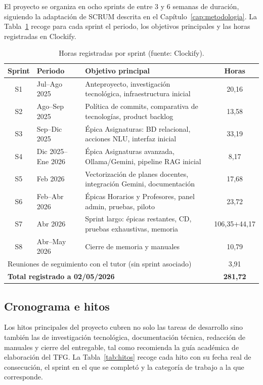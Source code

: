 El proyecto se organiza en ocho sprints de entre 3 y 6 semanas de duración, siguiendo la adaptación de SCRUM descrita en el Capítulo~\ref{cap:metodologia}. La Tabla~\ref{tab:sprints} recoge para cada sprint el periodo, los objetivos principales y las horas registradas en Clockify.

\begin{table}[hbtp]
\centering
\small
\begin{tabular}{|c|p{2.2cm}|p{5.5cm}|c|}
\hline
\textbf{Sprint} & \textbf{Periodo} & \textbf{Objetivo principal} & \textbf{Horas} \\ \hline
S1 & Jul--Ago 2025  & Anteproyecto, investigación tecnológica, infraestructura inicial & 20,16 \\ \hline
S2 & Ago--Sep 2025  & Política de commits, comparativa de tecnologías, product backlog & 13,58 \\ \hline
S3 & Sep--Dic 2025  & Épica Asignaturas: BD relacional, acciones NLU, interfaz inicial & 33,19 \\ \hline
S4 & Dic 2025--Ene 2026 & Épica Asignaturas avanzada, Ollama/Gemini, pipeline RAG inicial & 8,17 \\ \hline
S5 & Feb 2026       & Vectorización de planes docentes, integración Gemini, documentación & 17,68 \\ \hline
S6 & Feb--Abr 2026  & Épicas Horarios y Profesores, panel admin, pruebas, piloto & 23,72 \\ \hline
S7 & Abr 2026       & Sprint largo: épicas restantes, CD, pruebas exhaustivas, memoria & 106,35+44,17 \\ \hline
S8 & Abr--May 2026  & Cierre de memoria y manuales                                    & 10,79 \\ \hline
\multicolumn{3}{|l|}{Reuniones de seguimiento con el tutor (sin sprint asociado)} & 3,91 \\ \hline
\multicolumn{3}{|l|}{\textbf{Total registrado a 02/05/2026}} & \textbf{281,72} \\ \hline
\end{tabular}
\caption{Horas registradas por sprint (fuente: Clockify).}
\label{tab:sprints}
\end{table}

\subsection{Cronograma e hitos}\label{sec:cronograma}

Los hitos principales del proyecto cubren no solo las tareas de desarrollo sino también las de investigación tecnológica, documentación técnica, redacción de manuales y cierre del entregable, tal como recomienda la guía académica de elaboración del TFG. La Tabla~\ref{tab:hitos} recoge cada hito con su fecha real de consecución, el sprint en el que se completó y la categoría de trabajo a la que corresponde.

